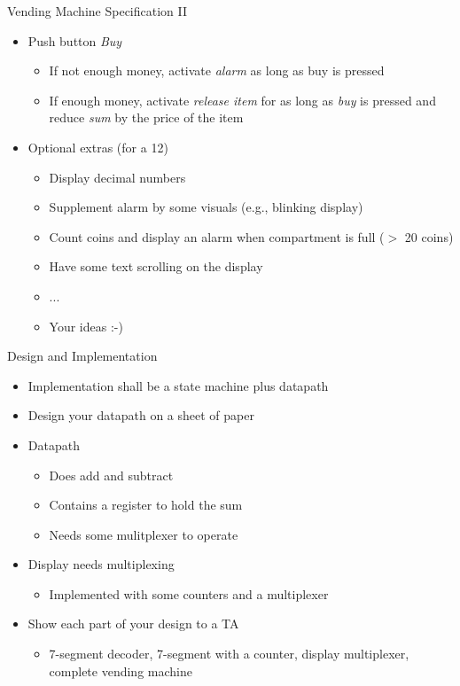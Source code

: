 \begin{frame}[fragile]{Vending Machine Specification II}
\begin{itemize}
\item Push button \emph{Buy}
\begin{itemize}
\item If not enough money, activate \emph{alarm} as long as buy is pressed
\item If enough money, activate \emph{release item} for as long as \emph{buy}
is pressed and reduce \emph{sum} by the price of the item
\end{itemize}
\item Optional extras (for a 12)
\begin{itemize}
\item Display decimal numbers
\item Supplement alarm by some visuals (e.g., blinking display)
\item Count coins and display an alarm when compartment is full ($>$ 20 coins)
\item Have some text scrolling on the display
\item ...
\item Your ideas :-)
\end{itemize}
\end{itemize}
\end{frame}

\begin{frame}[fragile]{Design and Implementation}
\begin{itemize}
\item Implementation shall be a state machine plus datapath
\item Design your datapath on a sheet of paper
\item Datapath
\begin{itemize}
\item Does add and subtract
\item Contains a register to hold the sum
\item Needs some mulitplexer to operate
\end{itemize}
\item Display needs multiplexing
\begin{itemize}
\item Implemented with some counters and a multiplexer
\end{itemize}
\item Show each part of your design to a TA
\begin{itemize}
\item 7-segment decoder, 7-segment with a counter, display multiplexer, complete vending machine
\end{itemize}
\end{itemize}
\end{frame}

